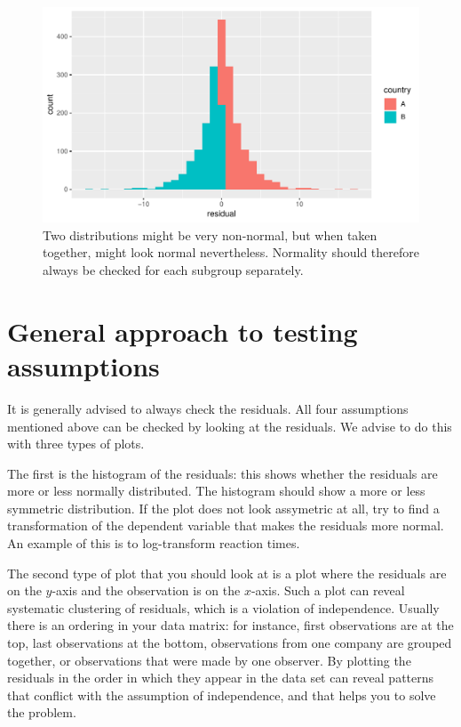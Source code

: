 \documentclass[]{book}\usepackage[]{graphicx}\usepackage[]{color}
\makeatletter
\def\maxwidth{ %
  \ifdim\Gin@nat@width>\linewidth
    \linewidth
  \else
    \Gin@nat@width
  \fi
}
\newenvironment{knitrout}{}{} %
\makeatother
\begin{document}
\begin{knitrout}
\color{fgcolor}\begin{figure}

{\centering \includegraphics[width=\maxwidth]{figure/ass_21a-1} 

}

\caption[Two distributions might be very non-normal, but when taken together, might look normal nevertheless]{Two distributions might be very non-normal, but when taken together, might look normal nevertheless. Normality should therefore always be checked for each subgroup separately.}\label{fig:ass_21a}
\end{figure}


\end{knitrout}



\section{General approach to testing assumptions}

It is generally advised to always check the residuals. All four assumptions mentioned above can be checked by looking at the residuals. We advise to do this with three types of plots. 

The first is the histogram of the residuals: this shows whether the residuals are more or less normally distributed. The histogram should show a more or less symmetric distribution. If the plot does not look assymetric at all, try to find a transformation of the dependent variable that makes the residuals more normal. An example of this is to log-transform reaction times. 

The second type of plot that you should look at is a plot where the residuals are on the $y$-axis and the observation is on the $x$-axis. Such a plot can reveal systematic clustering of residuals, which is a violation of independence. Usually there is an ordering in your data matrix: for instance, first observations are at the top, last observations at the bottom, observations from one company are grouped together, or observations that were made by one observer. By plotting the residuals in the order in which they appear in the data set can reveal patterns that conflict with the assumption of independence, and that helps you to solve the problem. 
\end{document}
